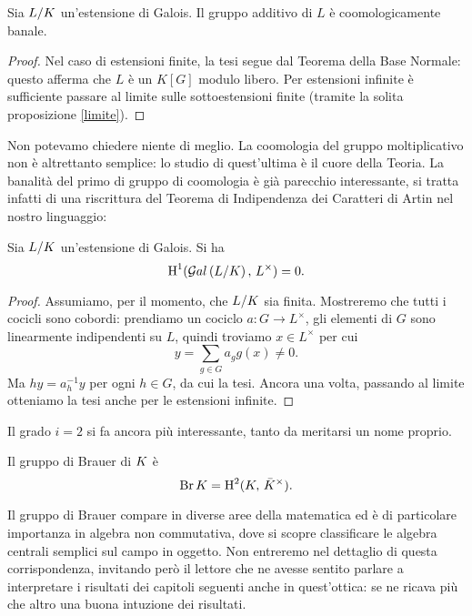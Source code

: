 \begin{theorem} \label{Hadd}
	Sia $ L / K $ un'estensione di Galois. Il gruppo additivo di $ L $ è coomologicamente banale.
\end{theorem}
\begin{proof}
	Nel caso di estensioni finite, la tesi segue dal Teorema della Base Normale: questo afferma che $ L $ è un $ K[G] $ modulo libero. Per estensioni infinite è sufficiente passare al limite sulle sottoestensioni finite (tramite la solita proposizione \ref{limite}).
\end{proof}

Non potevamo chiedere niente di meglio. La coomologia del gruppo moltiplicativo non è altrettanto semplice: lo studio di quest'ultima è il cuore della Teoria. La banalità del primo di gruppo di coomologia è già parecchio interessante, si tratta infatti di una riscrittura del Teorema di Indipendenza dei Caratteri di Artin nel nostro linguaggio:

\begin{theorem}[Hilbert 90]\label{H90}
	Sia $ L/K $ un'estensione di Galois. Si ha
	\[ \operatorname{H}^1(\mathcal{G}al\left(  L / K \right), \, L^\times) = 0. \]
\end{theorem}
\begin{proof}
	Assumiamo, per il momento, che $ L/K $ sia finita. Mostreremo che tutti i cocicli sono cobordi: prendiamo un cociclo $ a \colon G \to L^\times $, gli elementi di $ G $ sono linearmente indipendenti su $ L $, quindi troviamo $ x \in L^\times $ per cui
	\[ y = \sum_{g \in G} a_g g(x) \neq 0. \]
	Ma $ hy = a_h^{-1}y $ per ogni $ h \in G $, da cui la tesi.
	Ancora una volta, passando al limite otteniamo la tesi anche per le estensioni infinite. \todo[bruttino]
\end{proof}

Il grado $ i = 2 $ si fa ancora più interessante, tanto da meritarsi un nome proprio.
\begin{definition}
	Il gruppo di Brauer di $ K $ è $$  \operatorname{Br} K = \operatorname{H}^2(K, \, \bar{K}^\times).  $$
\end{definition}

Il gruppo di Brauer compare in diverse aree della matematica ed è di particolare importanza in algebra non commutativa, dove si scopre classificare le algebra centrali semplici sul campo in oggetto. Non entreremo nel dettaglio di questa corrispondenza, invitando però il lettore che ne avesse sentito parlare a interpretare i risultati dei capitoli seguenti anche in quest'ottica: se ne ricava più che altro una buona intuzione dei risultati.


